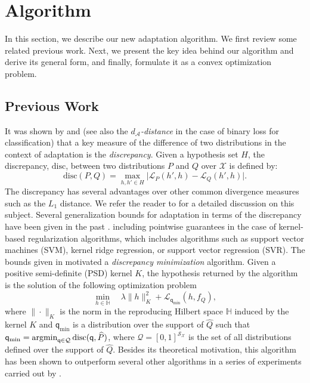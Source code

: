 \documentclass[twoside,11pt]{article}
\def\Hset{\mathbb{H}}
\DeclareMathOperator*{\argmin}{\rm argmin}
\newcommand{\h}{\widehat}
\newcommand{\cA}{{\mathcal A}}
\newcommand{\cL}{{\mathcal L}}
\newcommand{\cQ}{{\mathcal Q}}
\newcommand{\cS}{{\mathcal S}}
\newcommand{\cX}{{\mathcal X}}
\newcommand{\1}{\mat{1}}
\newcommand{\qq}{{\mathsf q}}
\newcommand{\qmin}{{\qq_\text{min}}}
\newcommand{\dis}{\mathrm{disc}}
\begin{document}
\section{Algorithm}
\label{sec:algorithm}

In this section, we describe our new adaptation algorithm. We first
review some related previous work. Next, we present the key idea
behind our algorithm and derive its general form, and finally,
formulate it as a convex optimization problem.

\subsection{Previous Work}
\label{subsec:discmin}

It was shown by \citet{MansourMohriRostamizadeh2009} and
\citet{CortesMohri2011} (see also the \emph{$d_{\cA}$-distance}
\citep{BenDavidBlitzerCrammerPereira2006} in the case of binary loss
for classification) that a key measure of the difference of two
distributions in the context of adaptation is the
\emph{discrepancy}. Given a hypothesis set $H$, the discrepancy,
$\dis$, between two distributions $P$ and $Q$ over $\cX$ is defined
by:
\begin{equation}
 \dis(P, Q) = \max_{h, h' \in H} \big| \cL_{P}(h', h) - \cL_{Q}(h', h) \big|.
\end{equation}
The discrepancy has several advantages over other common divergence
measures such as the $L_1$ distance. We refer the reader to
\citep{thesis} for a detailed discussion on this subject.
Several generalization bounds for adaptation in terms of the
discrepancy have been given in the past
\citep{BenDavidBlitzerCrammerPereira2006,
MansourMohriRostamizadeh2009,CortesMohri2011,CortesMohri2013}.
including pointwise guarantees in the case of kernel-based
regularization algorithms, which includes algorithms such as support
vector machines (SVM), kernel ridge regression, or support vector
regression (SVR). The bounds given in
\citep{MansourMohriRostamizadeh2009} motivated a \emph{discrepancy
minimization} algorithm. Given a positive semi-definite (PSD) kernel
$K$, the hypothesis returned by the algorithm is the solution of the
following optimization problem
\begin{equation}
\label{eq:qmin-opt}
\min_{h \in \Hset} \quad \lambda \| h \|_K^2 + \cL_{\qmin} (h, f_Q),
\end{equation}
where $\| \cdot \|_K $ is the norm in the reproducing Hilbert space
$\Hset$ induced by the kernel $K$ and $\qmin$ is a distribution over
the support of $\h Q$ such that
$\qmin = \argmin_{\qq \in \cQ} \dis(\qq, \h P)$, where
$\cQ = [0,1]^{\cS_\cX}$ is the set of all distributions defined
over the support of $\h Q$. Besides its theoretical motivation, this
algorithm has been shown
to outperform several other algorithms in a series of experiments
carried out by \cite{CortesMohri2013}.
\end{document}
